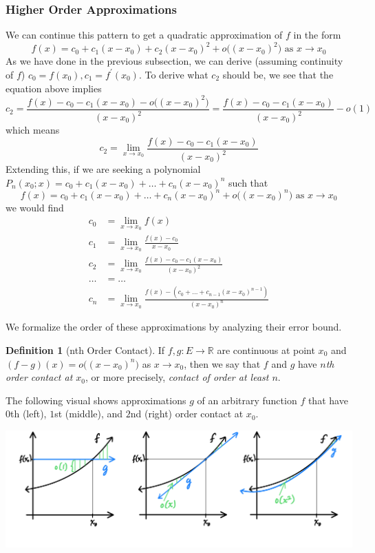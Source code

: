 \documentclass{article}
\theoremstyle{remark}
\theoremstyle{definition}
\newtheorem{definition}{Definition}[section]
\begin{document}
\subsubsection{Higher Order Approximations}
We can continue this pattern to get a quadratic approximation of $f$ in the form
\[f(x) = c_0 + c_1 (x - x_0) + c_2 (x - x_0)^2 + o\big((x - x_0)^2 \big) \text{ as } x \rightarrow x_0\]
As we have done in the previous subsection, we can derive (assuming continuity of $f$) $c_0 = f(x_0), c_1 = f^\prime (x_0)$. To derive what $c_2$ should be, we see that the equation above implies
\[c_2 = \frac{f(x) - c_0 - c_1 (x - x_0) - o\big((x - x_0)^2 \big)}{(x - x_0)^2} = \frac{f(x) - c_0 - c_1 (x - x_0)}{(x - x_0)^2} - o(1)\]
which means
\[c_2 = \lim_{x \rightarrow x_0} \frac{f(x) - c_0 - c_1 (x - x_0)}{(x - x_0)^2}\]
Extending this, if we are seeking a polynomial $P_n(x_0; x) = c_0 + c_1 (x - x_0) + \ldots + c_n (x - x_0)^n$ such that
\[f(x) = c_0 + c_1 (x - x_0) + \ldots + c_n (x - x_0)^n + o\big((x - x_0)^n\big) \text{ as } x \rightarrow x_0\]
we would find 
\begin{align*}
    c_0 & = \lim_{x \rightarrow x_0} f(x) \\
    c_1 & = \lim_{x \rightarrow x_0} \frac{f(x) - c_0}{x - x_0} \\
    c_2 & = \lim_{x \rightarrow x_0} \frac{f(x) - c_0 - c_1 (x - x_0)}{(x - x_0)^2} \\
    \ldots & = \ldots \\
    c_n & = \lim_{x \rightarrow x_0} \frac{f(x) - (c_0 + \ldots + c_{n-1}(x - x_0)^{n-1})}{(x - x_0)^n}
\end{align*}

We formalize the order of these approximations by analyzing their error bound. 

\begin{definition}[nth Order Contact]
If $f, g: E \longrightarrow \mathbb{R}$ are continuous at point $x_0$ and $(f - g) (x) = o\big( (x - x_0)^n \big)$ as $x \rightarrow x_0$, then we say that $f$ and $g$ have \textit{$n$th order contact at $x_0$}, or more precisely, \textit{contact of order at least $n$}. 

The following visual shows approximations $g$ of an arbitrary function $f$ that have $0$th (left), $1$st (middle), and $2$nd (right) order contact at $x_0$. 
\begin{center}
    \includegraphics[scale=0.3]{img/nth_order_contact.PNG}
\end{center}
\end{definition}
\end{document}
